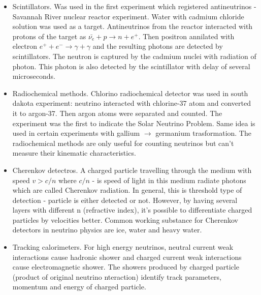\begin{itemize}
  \item Scintillators. Was used in the first experiment which registered antineutrinos - Savannah River nuclear reactor experiment. Water with cadmium chloride solution was used as a target. Antineutrinos from the reactor interacted with protons of the target as $\bar{\nu_e}+p \rightarrow n+e^+$. Then positron annilated with electron $e^+ + e^- \rightarrow \gamma + \gamma$ and the resulting photons are detected by scintillators. The neutron is captured by the cadmium nuclei with radiation of photon. This photon is also detected by the scintillator with delay of several microseconds. 
  \item Radiochemical methods. Chlorino radiochemical detector was used in south dakota experiment: neutrino interacted with chlorine-37 atom and converted it to argon-37. Then argon atoms were separated and counted. The experiment was the first to indicate the Solar Neutrino Problem. Same idea is used in certain experiments with gallium $\rightarrow$ germanium trasformation. The radiochemical methods are only useful for counting neutrinos but can't measure their kinematic characteristics.
  \item Cherenkov detectros. A charged particle travelling through the medium with speed $v>c/n$ where $c/n$ - is speed of light in this medium radiate photons which are called Cherenkov radiation. In general, this is threshold type of detection - particle is either detected or not. However, by having several layers with different n (refractive index), it's possible to differentiate charged particles by velocities better. Common working substance for Cherenkov detectors in neutrino physics are ice, water and heavy water.
  \item Tracking calorimeters. For high energy neutrinos, neutral current weak interactions cause hadronic shower and charged current weak interactions cause electromagnetic shower. The showers produced by charged particle (product of original neutrino nteraction) identify track parameters, momentum and energy of charged particle.
\end{itemize}


